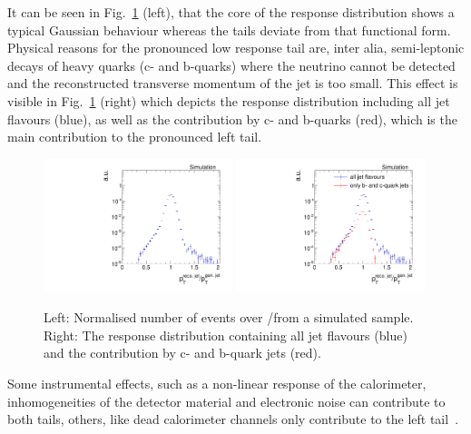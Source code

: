It can be seen in Fig.~\ref{res:fig:TypicalResponse} (left), that the core of the response distribution shows a typical Gaussian behaviour whereas the tails deviate from that functional form.
Physical reasons for the pronounced low response tail are, inter alia, semi-leptonic decays of heavy quarks (c- and b-quarks) where the neutrino cannot be detected and the reconstructed transverse momentum of the jet is too small.
This effect is visible in Fig.~\ref{res:fig:TypicalResponse} (right) which depicts the response distribution including all jet flavours (blue), as well as the contribution by c- and b-quarks (red), which is the main contribution to the pronounced left tail.
\begin{figure}[b]
  \centering
      \includegraphics[width=0.49\textwidth]{figures/resolution/generalApproach/ExampleResponse.pdf}
      \includegraphics[width=0.49\textwidth]{figures/resolution/generalApproach/intrinsicExampleContributionofBCQuarks.pdf}
  \caption{Left:  Normalised number of events over \ptrecojet/\ptgenjet from a simulated \GAMJET sample. 
           Right: The response distribution containing all jet flavours (blue) and the contribution by c- and b-quark jets (red). }  
  \label{res:fig:TypicalResponse}
\end{figure}
Some instrumental effects, such as a non-linear response of the calorimeter, inhomogeneities of the detector material and electronic noise can contribute to both tails, 
others, like dead calorimeter channels only contribute to the left tail~\cite{bib:Matthias_Thesis}. 




